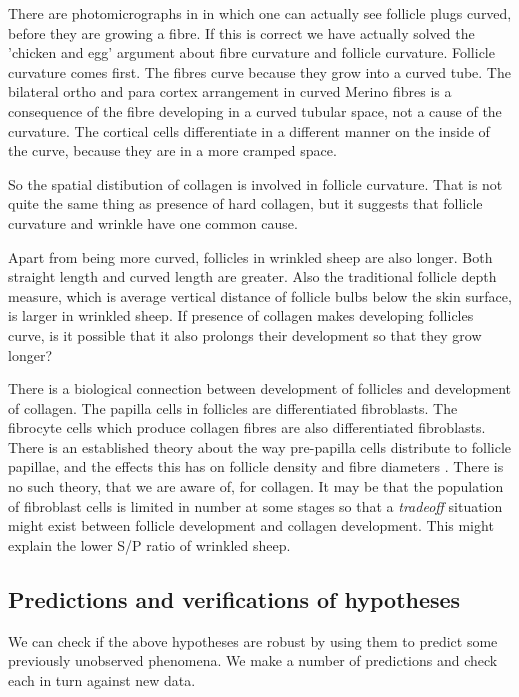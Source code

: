 \documentclass{article}
\begin{document}
There are photomicrographs in \cite{hardy-1956} in which one can actually see follicle plugs curved, before they are growing a fibre. If this is correct we have actually solved the 'chicken and egg' argument about fibre curvature and follicle curvature. Follicle curvature comes first. The fibres curve because they grow into a curved tube. The bilateral ortho and para cortex arrangement in curved Merino fibres is a consequence of the fibre developing in a curved tubular space, not a cause of the curvature. The cortical cells differentiate in a different manner on the inside of the curve, because they are in a more cramped space.

So the spatial distibution of collagen is involved in follicle curvature. That is not quite the same thing as presence of hard collagen, but it suggests that follicle curvature and wrinkle have one common cause.

Apart from being more curved, follicles in wrinkled sheep are also longer. Both straight length and curved length are greater. Also the traditional follicle depth measure, which is average vertical distance of follicle bulbs below the skin surface, is larger in wrinkled sheep.  If presence of collagen makes developing follicles curve, is it possible that it also prolongs their development so that they grow longer? 

There is a biological connection between development of follicles and development of collagen. The papilla cells in follicles are differentiated fibroblasts. The fibrocyte cells which produce collagen fibres are also differentiated fibroblasts.  There is an established theory about the way pre-papilla cells distribute to follicle papillae, and the effects this has on follicle density and fibre diameters \cite{moore-1989,moore-1996}. There is no such theory, that we are aware of, for collagen. It may be that the population of fibroblast cells is limited in number at some stages so that a {\em tradeoff} situation might exist between follicle development and collagen development. This might explain the lower S/P ratio of wrinkled sheep.

\subsection{Predictions and verifications of hypotheses}
We can check if the above hypotheses are robust by using them to predict some previously unobserved phenomena. We make a number of predictions and check each in turn against new data.
\end{document}
